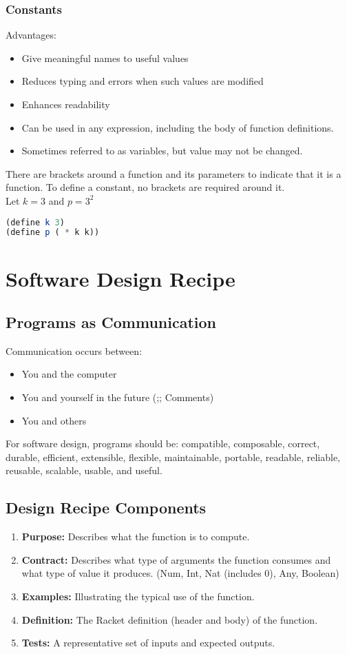 \documentclass[english, 12pt]{article}
\begin{document}
\subsubsection*{Constants}
Advantages:
\begin{itemize}
\item Give meaningful names to useful values
\item Reduces typing and errors when such values are modified
\item Enhances readability
\item Can be used in any expression, including the body of function definitions.
\item Sometimes referred to as variables, but value may not be changed.
\end{itemize}

\begin{exmp}
There are brackets around a function and its parameters to indicate that it is a function. To define a constant, no brackets are required around it.\\
Let $k=3$ and $p=3^2$
\begin{lstlisting}[language=Scheme]
(define k 3)
(define p ( * k k))
\end{lstlisting}
\end{exmp}

\section{Software Design Recipe}
\subsection{Programs as Communication}
Communication occurs between:
\begin{itemize}
\item You and the computer
\item You and yourself in the future (;; Comments)
\item You and others
\end{itemize}

For software design, programs should be: compatible, composable, correct, durable, efficient, extensible,
flexible, maintainable, portable, readable, reliable, reusable, scalable, usable, and useful.
\subsection{Design Recipe Components}
\begin{enumerate}
\item \textbf{Purpose:} Describes what the function is to compute.
\item \textbf{Contract:} Describes what type of arguments the function consumes and what type of value it produces.
(Num, Int, Nat (includes 0), Any, Boolean)
\item \textbf{Examples:} Illustrating the typical use of the function.
\item \textbf{Definition:} The Racket definition (header and body) of the function.
\item \textbf{Tests:} A representative set of inputs and expected outputs.
\end{enumerate}
\end{document}

